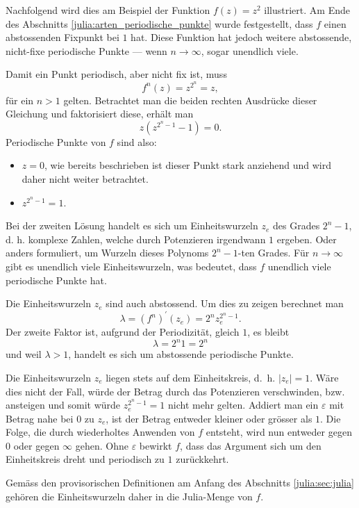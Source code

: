 \begin{beispiel}
Nachfolgend wird dies am Beispiel der Funktion $f(z) = z^2$ illustriert.
Am Ende des Abschnitts \ref{julia:arten_periodische_punkte} wurde festgestellt, dass $f$ einen abstossenden Fixpunkt bei $1$ hat.
Diese Funktion hat jedoch weitere abstossende, nicht-fixe periodische Punkte --- wenn $n \to \infty$, sogar unendlich viele.

Damit ein Punkt periodisch, aber nicht fix ist, muss
\begin{equation*}
    f^n(z) = z^{2^n} = z,
\end{equation*}
für ein $n > 1$ gelten.
Betrachtet man die beiden rechten Ausdrücke dieser Gleichung und faktorisiert diese, erhält man
\begin{equation*}
    z \left(z^{2^n - 1} - 1\right) = 0.
\end{equation*}
Periodische Punkte von $f$ sind also:
\begin{itemize}
    \item $z = 0$, wie bereits beschrieben ist dieser Punkt stark anziehend und wird daher nicht weiter betrachtet.
    \item $z^{2^n - 1} = 1$.
\end{itemize}

Bei der zweiten Lösung handelt es sich um Einheitswurzeln $z_e$ des Grades $2^n - 1$, d. h. komplexe Zahlen, welche durch Potenzieren irgendwann $1$ ergeben.
Oder anders formuliert, um Wurzeln dieses Polynoms $2^n - 1$-ten Grades.
Für $n \to \infty$ gibt es unendlich viele Einheitswurzeln, was bedeutet, dass $f$ unendlich viele periodische Punkte hat.

Die Einheitswurzeln $z_e$ sind auch abstossend. Um dies zu zeigen berechnet man
\begin{equation*}
    \lambda = \left(f^n\right)^\prime(z_e) = 2^n z_e^{2^n - 1}.
\end{equation*}
Der zweite Faktor ist, aufgrund der Periodizität, gleich $1$, es bleibt
\begin{equation*}
    \lambda = 2^n 1 = 2^n
\end{equation*}
und weil $\lambda > 1$, handelt es sich um abstossende periodische Punkte.

Die Einheitswurzeln $z_e$ liegen stets auf dem Einheitskreis, d.~h. $|z_e| = 1$.
Wäre dies nicht der Fall, würde der Betrag durch das Potenzieren verschwinden, bzw. ansteigen und somit würde $z_e^{2^n - 1} = 1$ nicht mehr gelten.
Addiert man ein $\varepsilon$ mit Betrag nahe bei $0$ zu $z_e$, ist der Betrag entweder kleiner oder grösser als $1$.
Die Folge, die durch wiederholtes Anwenden von $f$ entsteht, wird nun entweder gegen $0$ oder gegen $\infty$ gehen.
Ohne $\varepsilon$ bewirkt $f$, dass das Argument sich um den Einheitskreis dreht und periodisch zu $1$ zurückkehrt.

Gemäss den provisorischen Definitionen am Anfang des Abschnitts \ref{julia:sec:julia} gehören die Einheitswurzeln daher in die Julia-Menge von $f$.
\end{beispiel}

